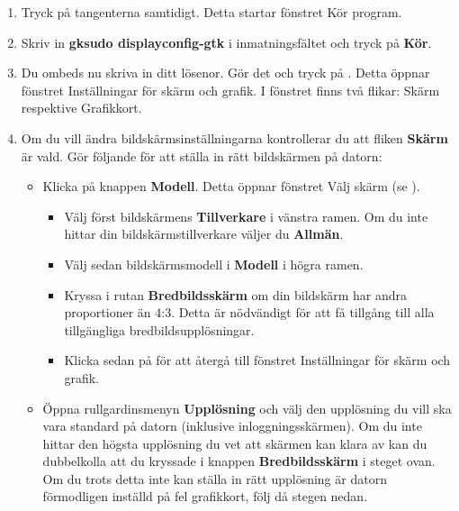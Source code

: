 \documentclass[a4paper,final]{memoir} %
\begin{document}
\begin{enumerate}

\item Tryck på tangenterna  samtidigt. Detta startar fönstret Kör program.

\item Skriv in \textbf{gksudo displayconfig-gtk} i inmatningsfältet och tryck på \textbf{Kör}.

\item Du ombeds nu skriva in ditt lösenor. Gör det och tryck på \xok{}. Detta öppnar fönstret Inställningar för skärm och grafik. I fönstret finns två flikar: Skärm respektive Grafikkort. 

\item Om du vill ändra bildskärmsinställningarna kontrollerar du att fliken \textbf{Skärm} är vald. Gör följande för att ställa in rätt bildskärmen på datorn:

\begin{itemize}

\item Klicka på knappen \textbf{Modell}. Detta öppnar fönstret Välj skärm (se ).


\begin{itemize}

\item Välj först bildskärmens \textbf{Tillverkare} i vänstra ramen. Om du inte hittar din bildskärmstillverkare väljer du \textbf{Allmän}.

\item Välj sedan bildskärmsmodell i \textbf{Modell} i högra ramen.

\item Kryssa i rutan \textbf{Bredbildsskärm} om din bildskärm har andra proportioner än 4:3. Detta är nödvändigt för att få tillgång till alla tillgängliga bredbildsupplösningar.

\item Klicka sedan på \xok{} för att återgå till fönstret Inställningar för skärm och grafik.

\end{itemize}

\item Öppna rullgardinsmenyn \textbf{Upplösning} och välj den upplösning du vill ska vara standard på datorn (inklusive inloggningsskärmen). Om du inte hittar den högsta upplösning du vet att skärmen kan klara av kan du dubbelkolla att du kryssade i knappen \textbf{Bredbildsskärm} i steget ovan. Om du trots detta inte kan ställa in rätt upplösning är datorn förmodligen inställd på fel grafikkort, följ då stegen nedan.


\end{itemize}
\end{enumerate}
\end{document}
